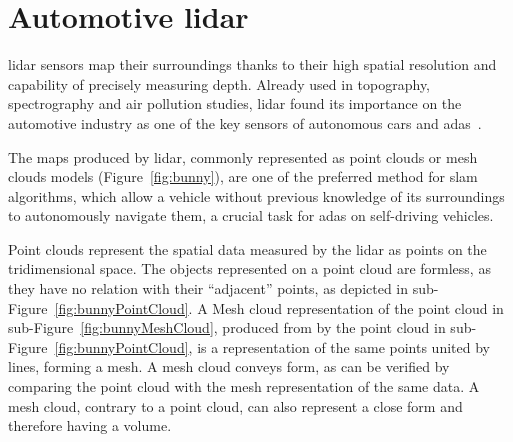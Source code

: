 \section{Automotive \acs{lidar}}
\label{sec:sota:automotive-lidar}
\ac{lidar} sensors map their surroundings thanks to their high spatial resolution and capability of precisely measuring depth. Already used in topography, spectrography and air pollution studies, \ac{lidar} found its importance on the automotive industry as one of the key sensors of autonomous cars and \ac{adas}~\cite{Sullivan2016}. 

The maps produced by \ac{lidar}, commonly represented as point clouds or mesh clouds models (Figure~\ref{fig:bunny}), are one of the preferred method for \ac{slam} algorithms, which allow a vehicle without previous knowledge of its surroundings to autonomously navigate them, a crucial task for \ac{adas} on self-driving vehicles.

Point clouds represent the spatial data measured by the \ac{lidar} as points on the tridimensional space. The objects represented on a point cloud are formless, as they have no relation with their ``adjacent'' points, as depicted in sub-Figure~\ref{fig:bunnyPointCloud}. A Mesh cloud representation of the point cloud in sub-Figure~\ref{fig:bunnyMeshCloud}, produced from by the point cloud in sub-Figure~\ref{fig:bunnyPointCloud}, is a representation of the same points united by lines, forming a mesh. A mesh cloud conveys form, as can be verified by comparing the point cloud with the mesh representation of the same data. A mesh cloud, contrary to a point cloud, can also represent a close form and therefore having a volume.

